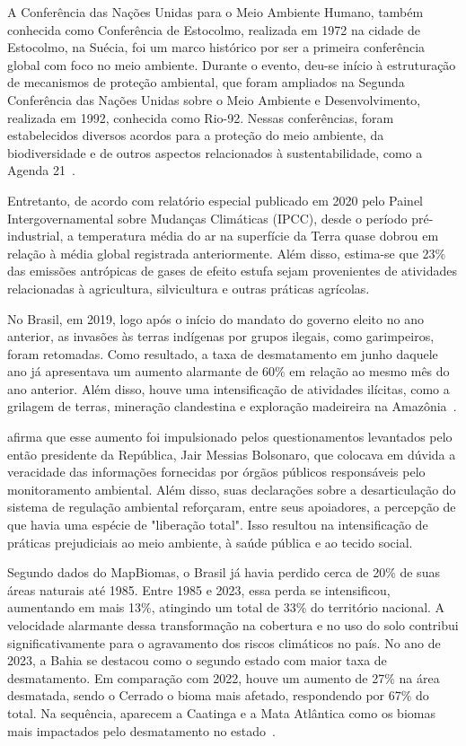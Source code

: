     A Conferência das Nações Unidas para o Meio Ambiente Humano, também conhecida como Conferência de Estocolmo, 
    realizada em 1972 na cidade de Estocolmo, na Suécia, foi um marco histórico por ser a primeira conferência 
    global com foco no meio ambiente. Durante o evento, deu-se início à estruturação de mecanismos de proteção 
    ambiental, que foram ampliados na Segunda Conferência das Nações Unidas sobre o Meio Ambiente e 
    Desenvolvimento, realizada em 1992, conhecida como Rio-92. Nessas conferências, foram estabelecidos 
    diversos acordos para a proteção do meio ambiente, da biodiversidade e de outros aspectos relacionados à 
    sustentabilidade, como a Agenda 21~\cite{passos2009}.

    Entretanto, de acordo com relatório especial publicado em 2020 pelo Painel Intergovernamental sobre Mudanças Climáticas (IPCC), 
    desde o período pré-industrial, a temperatura média do ar na superfície da Terra quase dobrou em relação à média 
    global registrada anteriormente. Além disso, estima-se que 23\% das emissões antrópicas de gases de efeito estufa 
    sejam provenientes de atividades relacionadas à agricultura, silvicultura e outras práticas agrícolas.

    No Brasil, em 2019, logo após o início do mandato do governo eleito no ano anterior, as invasões às terras 
    indígenas por grupos ilegais, como garimpeiros, foram retomadas. Como resultado, a taxa de desmatamento em 
    junho daquele ano já apresentava um aumento alarmante de 60\% em relação ao mesmo mês do ano anterior. 
    Além disso, houve uma intensificação de atividades ilícitas, como a grilagem de terras, mineração clandestina 
    e exploração madeireira na Amazônia~\cite{barretto2020}.

     afirma que esse aumento foi impulsionado pelos questionamentos levantados pelo então 
    presidente da República, Jair Messias Bolsonaro, que colocava em dúvida a veracidade das informações fornecidas 
    por órgãos públicos responsáveis pelo monitoramento ambiental. Além disso, suas declarações sobre a desarticulação do sistema 
    de regulação ambiental reforçaram, entre seus apoiadores, a percepção de que havia uma espécie de "liberação total". Isso
    resultou na intensificação de práticas prejudiciais ao meio ambiente, à saúde pública e ao tecido social.

    Segundo dados do MapBiomas, o Brasil já havia perdido cerca de 20\% de suas áreas naturais até 1985. Entre 
    1985 e 2023, essa perda se intensificou, aumentando em mais 13\%, atingindo um total de 33\% do território 
    nacional. A velocidade alarmante dessa transformação na cobertura e no uso do solo contribui significativamente 
    para o agravamento dos riscos climáticos no país. No ano de 2023, a Bahia se destacou como o segundo estado 
    com maior taxa de desmatamento. Em comparação com 2022, houve um aumento de 27\% na área desmatada, sendo o 
    Cerrado o bioma mais afetado, respondendo por 67\% do total. Na sequência, aparecem a Caatinga e a Mata 
    Atlântica como os biomas mais impactados pelo desmatamento no estado~\cite{polcri2024}.
    

